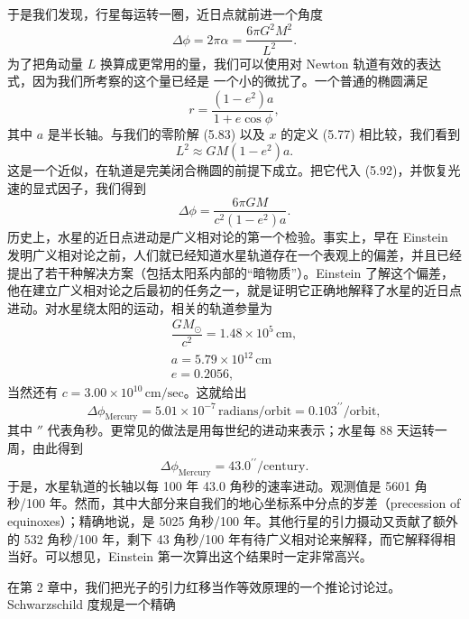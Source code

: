 于是我们发现，行星每运转一圈，近日点就前进一个角度
\begin{equation*}
\Delta\phi = 2\pi\alpha = \frac{6\pi G^2M^2}{L^2}.
\tag{5.92}
\end{equation*}
为了把角动量 $L$ 换算成更常用的量，我们可以使用对 Newton 轨道有效的表达式，因为我们所考察的这个量已经是
一个小的微扰了。一个普通的椭圆满足
\begin{equation*}
r = \frac{(1-e^2)a}{1+e\cos\phi},
\tag{5.93}
\end{equation*}
其中 $a$ 是半长轴。与我们的零阶解 (5.83) 以及 $x$ 的定义 (5.77) 相比较，我们看到
\begin{equation*}
L^2 \approx GM(1-e^2)a.
\tag{5.94}
\end{equation*}
这是一个近似，在轨道是完美闭合椭圆的前提下成立。把它代入 (5.92)，并恢复光速的显式因子，我们得到
\begin{equation*}
\Delta\phi = \frac{6\pi GM}{c^2(1-e^2)a}.
\tag{5.95}
\end{equation*}
历史上，水星的近日点进动是广义相对论的第一个检验。事实上，早在 Einstein 发明广义相对论之前，人们就已经知道水星轨道存在一个表观上的偏差，并且已经提出了若干种解决方案（包括太阳系内部的“暗物质”）。Einstein 了解这个偏差，他在建立广义相对论之后最初的任务之一，就是证明它正确地解释了水星的近日点进动。对水星绕太阳的运动，相关的轨道参量为
\begin{equation*}
\begin{array}{c}
\dfrac{GM_\odot}{c^2} = 1.48\times 10^5\,\mathrm{cm},\\[8pt]
a = 5.79\times 10^{12}\,\mathrm{cm}\\[6pt]
e = 0.2056,
\end{array}
\tag{5.96}
\end{equation*}
当然还有 $c = 3.00\times 10^{10}\,\mathrm{cm/sec}$。这就给出
\begin{equation*}
\Delta\phi_{\mathrm{Mercury}} = 5.01\times 10^{-7}\,\mathrm{radians/orbit} = 0.103^{\prime\prime}/\mathrm{orbit},
\tag{5.97}
\end{equation*}
其中 $''$ 代表角秒。更常见的做法是用每世纪的进动来表示；水星每 88 天运转一周，由此得到
\begin{equation*}
\Delta\phi_{\mathrm{Mercury}} = 43.0^{\prime\prime}/\mathrm{century}.
\tag{5.98}
\end{equation*}
于是，水星轨道的长轴以每 100 年 43.0 角秒的速率进动。观测值是 5601 角秒/100 年。然而，其中大部分来自我们的地心坐标系中分点的岁差（precession of equinoxes）；精确地说，是 5025 角秒/100 年。其他行星的引力摄动又贡献了额外的 532 角秒/100 年，剩下 43 角秒/100 年有待广义相对论来解释，而它解释得相当好。可以想见，Einstein 第一次算出这个结果时一定非常高兴。

在第 2 章中，我们把光子的引力红移当作等效原理的一个推论讨论过。Schwarzschild 度规是一个精确
